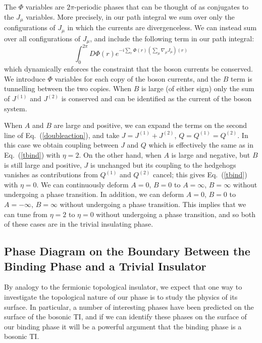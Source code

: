 \documentclass[prb,twocolumn]{revtex4-1}
\begin{document}
The $\Phi$ variables are $2\pi$-periodic phases that can be thought of as conjugates to the $J_\mu$ variables. More precisely, in our path integral we sum over only the configurations of $J_\mu$ in which the currents are divergenceless. We can instead sum over all configurations of $J_\mu$, and include the following term in our path integral:
\begin{equation}
\int_0^{2\pi} D\Phi(r) e^{-i\sum_r \Phi(r)(\sum_\mu\nabla_\mu J_\mu)(r)}
\end{equation}
which dynamically enforces the constraint that the boson currents be conserved. We introduce $\Phi$ variables for each copy of the boson currents, and the $B$ term is tunnelling between the two copies. 
When $B$ is large (of either sign) only the sum of $J^{(1)}$ and $J^{(2)}$ is conserved and can be identified as the current of the boson system.

When $A$ and $B$ are large and positive, we can expand the terms on the second line of Eq.~(\ref{doubleaction}), and take $J = J^{(1)} + J^{(2)}$, $Q = Q^{(1)} = Q^{(2)}$. In this case we obtain coupling between $J$ and $Q$ which is effectively the same as in Eq.~(\ref{tbind}) with $\eta=2$. 
On the other hand, when $A$ is large and negative, but $B$ is still large and positive, $J$ is unchanged but its coupling to the hedgehogs vanishes as contributions from $Q^{(1)}$ and $Q^{(2)}$ cancel; this gives Eq.~(\ref{tbind}) with $\eta=0$.
We can continuously deform $A=0$, $B=0$ to $A=\infty$, $B=\infty$ without undergoing a phase transition. In addition, we can deform $A=0$, $B=0$ to $A=-\infty$, $B=\infty$ without undergoing a phase transition. This implies that we can tune from $\eta=2$ to $\eta=0$ without undergoing a phase transition, and so both of these cases are in the trivial insulating phase.


\subsection{Phase Diagram on the Boundary Between the Binding Phase and a Trivial Insulator}
\label{subsec:heissurf}
By analogy to the fermionic topological insulator, we expect that one way to investigate the topological nature of our phase is to study the physics of its surface. In particular, a number of interesting phases have been predicted on the surface of the bosonic TI,\cite{SenthilVishwanath} and if we can identify these phases on the surface of our binding phase it will be a powerful argument that the binding phase is a bosonic TI.
\end{document}
